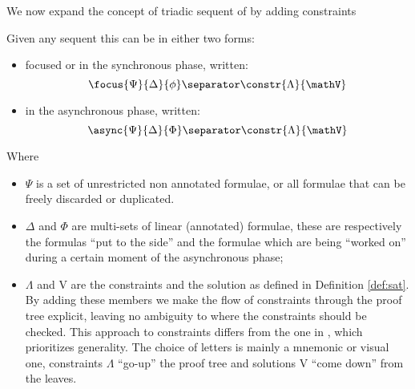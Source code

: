 We now expand the concept of triadic sequent of \cite{Focusing} by adding constraints
\begin{define}
	Given any sequent this can be in either two forms:
	\begin{itemize}
		\item focused or in the synchronous phase, written:
			$$\focus{\Psi}{\Delta}{\phi} \separator \constr{\Lambda}{\mathV}$$
		\item in the asynchronous phase, written:
			$$\async{\Psi}{\Delta}{\Phi} \separator \constr{\Lambda}{\mathV}$$
	\end{itemize}
	Where 
	\begin{itemize}
		\item $\Psi$ is a set of unrestricted non annotated formulae, or all formulae that can be freely discarded or duplicated.
		\item $\Delta$ and $\Phi$ are multi-sets of linear (annotated) formulae, these are respectively the formulas ``put to the side'' and the formulae which are being ``worked on'' during a certain moment of the asynchronous phase;
		\item $\Lambda$ and V are the constraints and the solution as defined in Definition \ref{def:sat}.
			By adding these members we make the flow of constraints through the proof tree explicit, leaving no ambiguity to where the constraints should be checked.
			This approach to constraints differs from the one in \cite{HarlandPym}, which prioritizes generality.
			The choice of letters is mainly a mnemonic or visual one, constraints $\Lambda$ ``go-up'' the proof tree and solutions V ``come down'' from the leaves.
	\end{itemize}
\end{define}

